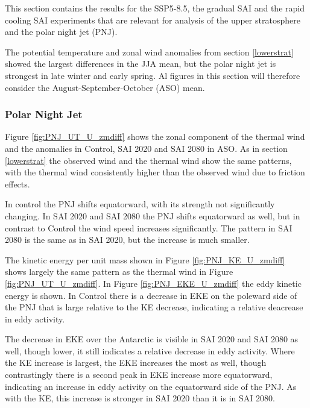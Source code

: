 This section contains the results for the SSP5-8.5, the gradual SAI and the rapid cooling SAI experiments that are relevant for analysis of the upper stratosphere and the polar night jet (PNJ).

The potential temperature and zonal wind anomalies from section \ref{lowerstrat} showed the largest differences in the JJA mean, but the polar night jet is strongest in late winter and early spring. Al figures in this section will therefore consider the August-September-October (ASO) mean. 

\subsubsection{Polar Night Jet}
Figure \ref{fig:PNJ_UT_U_zmdiff} shows the zonal component of the thermal wind and the anomalies in Control, SAI 2020 and SAI 2080 in ASO. As in section \ref{lowerstrat} the observed wind and the thermal wind show the same patterns, with the thermal wind consistently higher than the observed wind due to friction effects. 

In control the PNJ shifts equatorward, with its strength not significantly changing. In SAI 2020 and SAI 2080 the PNJ shifts equatorward as well, but in contrast to Control the wind speed increases significantly. The pattern in SAI 2080 is the same as in SAI 2020, but the increase is much smaller. 

The kinetic energy per unit mass shown in Figure \ref{fig:PNJ_KE_U_zmdiff} shows largely the same pattern as the thermal wind in Figure \ref{fig:PNJ_UT_U_zmdiff}. In Figure \ref{fig:PNJ_EKE_U_zmdiff} the eddy kinetic energy is shown. In Control there is a decrease in EKE on the poleward side of the PNJ that is large relative to the KE decrease, indicating a relative deacrease in eddy activity.

The decrease in EKE over the Antarctic is visible in SAI 2020 and SAI 2080 as well, though lower, it still indicates a relative decrease in eddy activity. Where the KE increase is largest, the EKE increases the most as well, though contrastingly there is a second peak in EKE increase more equatorward, indicating an increase in eddy activity on the equatorward side of the PNJ. As with the KE, this increase is stronger in SAI 2020 than it is in SAI 2080. 

